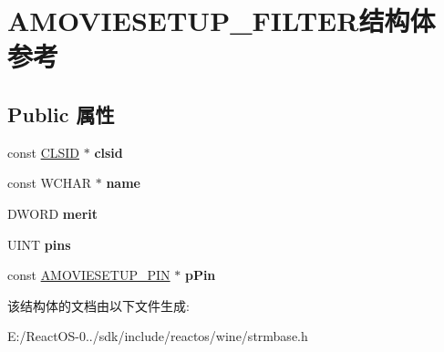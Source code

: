\hypertarget{struct_a_m_o_v_i_e_s_e_t_u_p___f_i_l_t_e_r}{}\section{A\+M\+O\+V\+I\+E\+S\+E\+T\+U\+P\+\_\+\+F\+I\+L\+T\+E\+R结构体 参考}
\label{struct_a_m_o_v_i_e_s_e_t_u_p___f_i_l_t_e_r}
\subsection*{Public 属性}
\begin{DoxyCompactItemize}
\item 
\mbox{\label{struct_a_m_o_v_i_e_s_e_t_u_p___f_i_l_t_e_r_a5094d723b3b938d5e52d93a99b14d5af}} 
const \hyperlink{struct___i_i_d}{C\+L\+S\+ID} $\ast$ {\bfseries clsid}
\item 
\mbox{\label{struct_a_m_o_v_i_e_s_e_t_u_p___f_i_l_t_e_r_adba2364b34122a387386f96b1ec0e8ea}} 
const W\+C\+H\+AR $\ast$ {\bfseries name}
\item 
\mbox{\label{struct_a_m_o_v_i_e_s_e_t_u_p___f_i_l_t_e_r_a84a57156bca13e4ba7843f242f5c8188}} 
D\+W\+O\+RD {\bfseries merit}
\item 
\mbox{\label{struct_a_m_o_v_i_e_s_e_t_u_p___f_i_l_t_e_r_a7e0382bb6a4c7bb3e071c35069ed95bf}} 
U\+I\+NT {\bfseries pins}
\item 
\mbox{\label{struct_a_m_o_v_i_e_s_e_t_u_p___f_i_l_t_e_r_ab97d39baa3711064ffcb6c05c5e6a38e}} 
const \hyperlink{struct_r_e_g_f_i_l_t_e_r_p_i_n_s}{A\+M\+O\+V\+I\+E\+S\+E\+T\+U\+P\+\_\+\+P\+IN} $\ast$ {\bfseries p\+Pin}
\end{DoxyCompactItemize}


该结构体的文档由以下文件生成\+:\begin{DoxyCompactItemize}
\item 
E\+:/\+React\+O\+S-\/0../sdk/include/reactos/wine/strmbase.\+h\end{DoxyCompactItemize}
